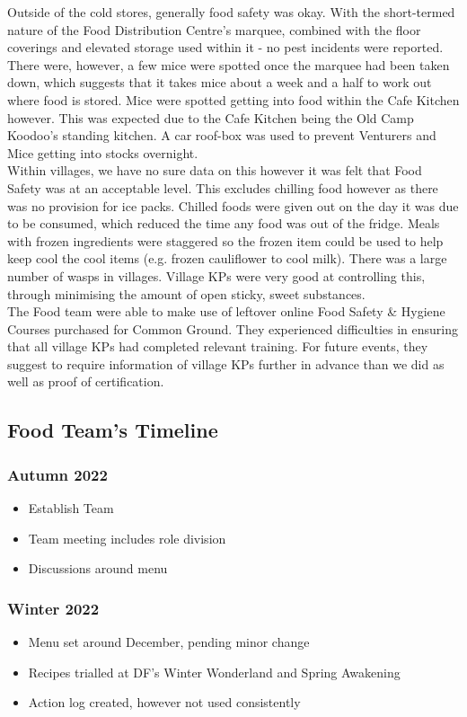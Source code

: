 Outside of the cold stores, generally food safety was okay. With the short-termed nature of the Food Distribution Centre's marquee, combined with the floor coverings and elevated storage used within it - no pest incidents were reported. There were, however, a few mice were spotted once the marquee had been taken down, which suggests that it takes mice about a week and a half to work out where food is stored. Mice were spotted getting into food within the Cafe Kitchen however. This was expected due to the Cafe Kitchen being the Old Camp Koodoo's standing kitchen. A car roof-box was used to prevent Venturers and Mice getting into stocks overnight.\\

Within villages, we have no sure data on this however it was felt that Food Safety was at an acceptable level. This excludes chilling food however as there was no provision for ice packs. Chilled foods were given out on the day it was due to be consumed, which reduced the time any food was out of the fridge. Meals with frozen ingredients were staggered so the frozen item could be used to help keep cool the cool items (e.g. frozen cauliflower to cool milk). There was a large number of wasps in villages. Village KPs were very good at controlling this, through minimising the amount of open sticky, sweet substances. \\

The Food team were able to make use of leftover online Food Safety \& Hygiene Courses purchased for Common Ground. They experienced difficulties in ensuring that all village KPs had completed relevant training. For future events, they suggest to require information of village KPs further in advance than we did as well as proof of certification.

\subsection{Food Team's Timeline}
\subsubsection{Autumn 2022}
\begin{itemize}
    \item Establish Team
    \item Team meeting includes role division
    \item Discussions around menu
\end{itemize}
\subsubsection{Winter 2022}
\begin{itemize}
    \item Menu set around December, pending minor change
    \item Recipes trialled at DF's Winter Wonderland and Spring Awakening
    \item Action log created, however not used consistently
\end{itemize}
